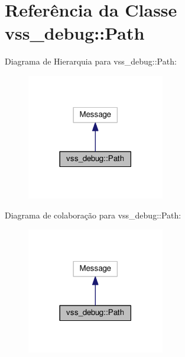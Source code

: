 \hypertarget{classvss__debug_1_1Path}{}\section{Referência da Classe vss\+\_\+debug\+:\+:Path}
\label{classvss__debug_1_1Path}


Diagrama de Hierarquia para vss\+\_\+debug\+:\+:Path\+:\nopagebreak
\begin{figure}[H]
\begin{center}
\leavevmode
\includegraphics[width=170pt]{classvss__debug_1_1Path__inherit__graph}
\end{center}
\end{figure}


Diagrama de colaboração para vss\+\_\+debug\+:\+:Path\+:\nopagebreak
\begin{figure}[H]
\begin{center}
\leavevmode
\includegraphics[width=170pt]{classvss__debug_1_1Path__coll__graph}
\end{center}
\end{figure}
